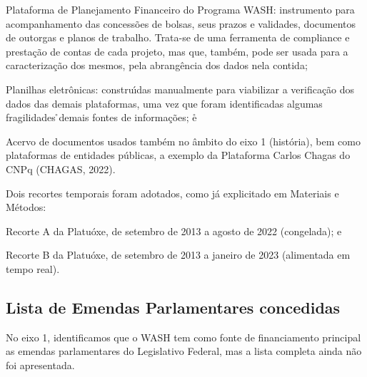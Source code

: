 \documentclass[
12pt,		%
openright,	%
twoside,  %
a4paper,			%
chapter=TITLE,		%
english,			%
french,				%
spanish,			%
brazil				%
]{USPSC-classe/USPSC}
\begin{document}
\begin{alineas}
\item Plataforma de Planejamento Financeiro do Programa WASH: instrumento para acompanhamento das concess\~oes de bolsas, seus prazos e validades, documentos de outorgas e planos de trabalho. Trata-se de uma ferramenta de compliance e presta\c{c}\~ao de contas de cada projeto, mas que, tamb\'em, pode ser usada para a caracteriza\c{c}\~ao dos mesmos, pela abrang\^encia dos dados nela contida;
\item Planilhas eletr\^onicas: constru\'{\i}das  manualmente para viabilizar a verifica\c{c}\~ao dos dados das demais plataformas, uma vez que foram identificadas algumas fragilidades \r\nnas demais fontes de informa\c{c}\~oes; e\r\n
\item Acervo de documentos usados tamb\'em no \^ambito do eixo 1 (hist\'oria), bem como plataformas de entidades p\'ublicas, a exemplo da Plataforma Carlos Chagas do CNPq (CHAGAS, 2022).
\end{alineas}

Dois recortes temporais foram adotados, como j\'a explicitado em Materiais e M\'etodos:


















\begin{alineas}
\item Recorte A da Platu\'oxe, de setembro de 2013 a agosto de 2022 (congelada); e
\item Recorte B da Platu\'oxe, de setembro de 2013 a janeiro de 2023 (alimentada em tempo real).
\end{alineas}

\subsection[Lista de Emendas Parlamentares concedidas]{Lista de Emendas Parlamentares concedidas}\label{Lista de Emendas Parlamentares concedidas}
No eixo 1, identificamos que o WASH tem como fonte de financiamento principal as emendas parlamentares do Legislativo Federal, mas a lista completa ainda n\~ao foi apresentada.
\end{document}
